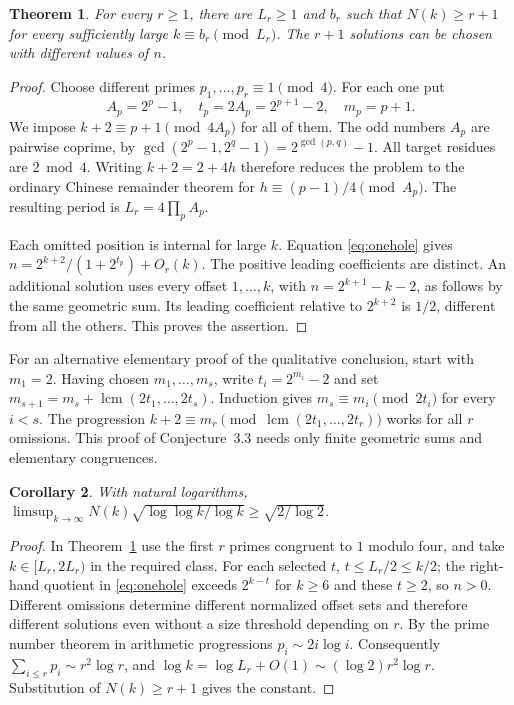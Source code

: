 \documentclass[11pt]{article}
\newtheorem{theorem}{Theorem}[section]
\newtheorem{corollary}[theorem]{Corollary}
\begin{document}
\begin{theorem}\label{thm:tuz}
For every $r\ge1$, there are $L_r\ge1$ and $b_r$ such that
$N(k)\ge r+1$ for every sufficiently large $k\equiv b_r\pmod{L_r}$.
The $r+1$ solutions can be chosen with different values of $n$.
\end{theorem}
\begin{proof}
Choose different primes $p_1,\ldots,p_r\equiv1\pmod4$.
For each one put
\[
 A_p=2^p-1,\quad t_p=2A_p=2^{p+1}-2,\quad m_p=p+1 .
\]
We impose $k+2\equiv p+1\pmod{4A_p}$ for all of them. The odd
numbers $A_p$ are pairwise coprime, by
$\gcd(2^p-1,2^q-1)=2^{\gcd(p,q)}-1$.
All target residues are $2\bmod4$. Writing $k+2=2+4h$ therefore
reduces the problem to the ordinary Chinese remainder theorem for
$h\equiv(p-1)/4\pmod{A_p}$. The resulting period is
$L_r=4\prod_p A_p$.

Each omitted position is internal for large $k$. Equation
\eqref{eq:onehole} gives $n=2^{k+2}/(1+2^{t_p})+O_r(k)$.
The positive leading coefficients are distinct. An additional solution
uses every offset $1,\ldots,k$, with
$n=2^{k+1}-k-2$, as follows by the same geometric sum.
Its leading coefficient relative to $2^{k+2}$ is $1/2$,
different from all the others. This proves the assertion.
\end{proof}

For an alternative elementary proof of the qualitative conclusion, start
with $m_1=2$. Having chosen $m_1,\ldots,m_s$, write $t_i=2^{m_i}-2$ and
set $m_{s+1}=m_s+\operatorname{lcm}(2t_1,\ldots,2t_s)$.
Induction gives $m_s\equiv m_i\pmod{2t_i}$ for every $i<s$.
The progression $k+2\equiv m_r\pmod{\operatorname{lcm}(2t_1,\ldots,2t_r)}$
works for all $r$ omissions. This proof of Conjecture~3.3 needs
only finite geometric sums and elementary congruences.

\begin{corollary}\label{cor:rate}
With natural logarithms,
$\displaystyle\limsup_{k\to\infty}N(k)\sqrt{\log\log k/\log k}
\ge\sqrt{2/\log2}$.
\end{corollary}
\begin{proof}
In Theorem~\ref{thm:tuz} use the first $r$ primes congruent to $1$
modulo four, and take $k\in[L_r,2L_r)$ in the required class.
For each selected $t$, $t\le L_r/2\le k/2$; the right-hand quotient
in \eqref{eq:onehole} exceeds $2^{k-t}$ for $k\ge6$ and these
$t\ge2$, so $n>0$. Different omissions determine different normalized
offset sets and therefore different solutions even without a size
threshold depending on $r$. By the prime number theorem in arithmetic
progressions $p_i\sim2i\log i$. Consequently
$\sum_{i\le r}p_i\sim r^2\log r$, and
$\log k=\log L_r+O(1)\sim(\log2)r^2\log r$.
Substitution of $N(k)\ge r+1$ gives the constant.
\end{proof}
\end{document}
